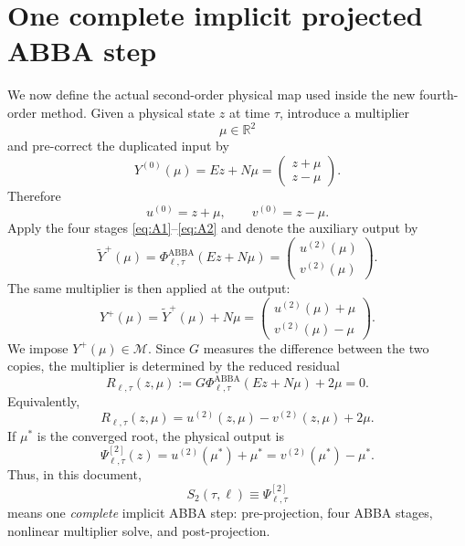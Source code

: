\documentclass[11pt,a4paper]{article}
\newcommand{\RR}{\mathbb{R}}
\newcommand{\PhiA}{\Phi^{\mathrm{ABBA}}}
\newcommand{\Psitwo}{\Psi^{[2]}}
\begin{document}
\section{One complete implicit projected ABBA step}
We now define the actual second-order physical map used inside the new fourth-order method. Given a physical state $z$ at time $\tau$, introduce a multiplier
\begin{equation}
    \mu\in\RR^2
\end{equation}
and pre-correct the duplicated input by
\begin{equation}
    Y^{(0)}(\mu)=Ez+N\mu
    =\begin{pmatrix}z+\mu\\z-\mu\end{pmatrix}.
    \label{eq:precorrection}
\end{equation}
Therefore
\begin{equation}
    u^{(0)}=z+\mu,
    \qquad
    v^{(0)}=z-\mu.
\end{equation}
Apply the four stages \eqref{eq:A1}--\eqref{eq:A2} and denote the auxiliary output by
\begin{equation}
    \widetilde Y^+(\mu)
    =\PhiA_{\ell,\tau}(Ez+N\mu)
    =\begin{pmatrix}u^{(2)}(\mu)\\v^{(2)}(\mu)\end{pmatrix}.
\end{equation}
The same multiplier is then applied at the output:
\begin{equation}
    Y^+(\mu)=\widetilde Y^+(\mu)+N\mu
    =\begin{pmatrix}u^{(2)}(\mu)+\mu\\v^{(2)}(\mu)-\mu\end{pmatrix}.
\end{equation}
We impose $Y^+(\mu)\in\mathcal M$. Since $G$ measures the difference between the two copies, the multiplier is determined by the reduced residual
\begin{equation}
    \boxed{
    R_{\ell,\tau}(z,\mu)
    :=G\PhiA_{\ell,\tau}(Ez+N\mu)+2\mu=0.
    }
    \label{eq:residual}
\end{equation}
Equivalently,
\begin{equation}
    R_{\ell,\tau}(z,\mu)
    =u^{(2)}(z,\mu)-v^{(2)}(z,\mu)+2\mu.
\end{equation}
If $\mu^*$ is the converged root, the physical output is
\begin{equation}
    \boxed{
    \Psitwo_{\ell,\tau}(z)
    =u^{(2)}(\mu^*)+\mu^*
    =v^{(2)}(\mu^*)-\mu^*.
    }
    \label{eq:implicitstep}
\end{equation}
Thus, in this document,
\begin{equation}
    \boxed{S_2(\tau,\ell)\equiv\Psitwo_{\ell,\tau}}
\end{equation}
means one \emph{complete} implicit ABBA step: pre-projection, four ABBA stages, nonlinear multiplier solve, and post-projection.
\end{document}
